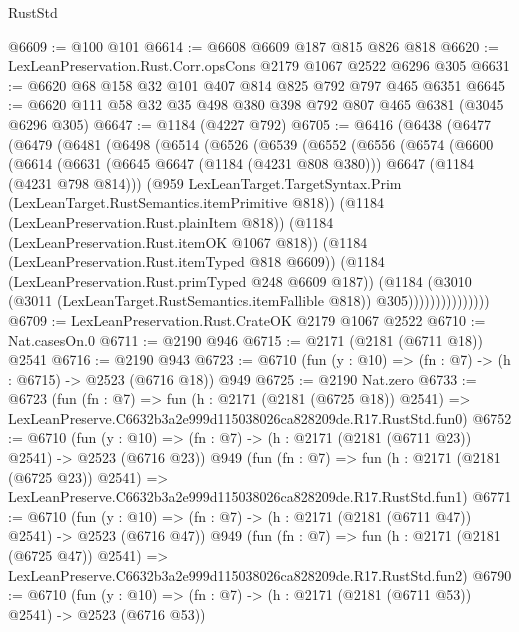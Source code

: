 \begin{lexlean}{RustStd}
\begin{coremodule}
@6609 := @100 @101
@6614 := @6608 @6609 @187 @815 @826 @818
@6620 := LexLeanPreservation.Rust.Corr.opsCons @2179 @1067 @2522 @6296 @305
@6631 := @6620 @68 @158 @32 @101 @407 @814 @825 @792 @797 @465 @6351
@6645 := @6620 @111 @58 @32 @35 @498 @380 @398 @792 @807 @465 @6381 (@3045 @6296 @305)
@6647 := @1184 (@4227 @792)
@6705 := @6416
    (@6438
      (@6477
        (@6479
          (@6481
            (@6498
              (@6514
                (@6526
                  (@6539
                    (@6552
                      (@6556
                        (@6574
                          (@6600
                            (@6614
                              (@6631
                                (@6645 @6647 (@1184 (@4231 @808 @380)))
                                @6647
                                (@1184 (@4231 @798 @814)))
                              (@959
                                LexLeanTarget.TargetSyntax.Prim
                                (LexLeanTarget.RustSemantics.itemPrimitive @818))
                              (@1184 (LexLeanPreservation.Rust.plainItem @818))
                              (@1184 (LexLeanPreservation.Rust.itemOK @1067 @818))
                              (@1184 (LexLeanPreservation.Rust.itemTyped @818 @6609))
                              (@1184 (LexLeanPreservation.Rust.primTyped @248 @6609 @187))
                              (@1184
                                (@3010
                                  (@3011 (LexLeanTarget.RustSemantics.itemFallible @818))
                                  @305)))))))))))))))
@6709 := LexLeanPreservation.Rust.CrateOK @2179 @1067 @2522
@6710 := Nat.casesOn.{0}
@6711 := @2190 @946
@6715 := @2171 (@2181 (@6711 @18)) @2541
@6716 := @2190 @943
@6723 := @6710 (fun (y : @10) => (fn : @7) -> (h : @6715) -> @2523 (@6716 @18)) @949
@6725 := @2190 Nat.zero
@6733 := @6723
    (fun (fn : @7) =>
    fun (h : @2171 (@2181 (@6725 @18)) @2541) =>
    LexLeanPreserve.C6632b3a2e999d115038026ca828209de.R17.RustStd.fun0)
@6752 := @6710
    (fun (y : @10) => (fn : @7) -> (h : @2171 (@2181 (@6711 @23)) @2541) -> @2523 (@6716 @23))
    @949
    (fun (fn : @7) =>
    fun (h : @2171 (@2181 (@6725 @23)) @2541) =>
    LexLeanPreserve.C6632b3a2e999d115038026ca828209de.R17.RustStd.fun1)
@6771 := @6710
    (fun (y : @10) => (fn : @7) -> (h : @2171 (@2181 (@6711 @47)) @2541) -> @2523 (@6716 @47))
    @949
    (fun (fn : @7) =>
    fun (h : @2171 (@2181 (@6725 @47)) @2541) =>
    LexLeanPreserve.C6632b3a2e999d115038026ca828209de.R17.RustStd.fun2)
@6790 := @6710
    (fun (y : @10) => (fn : @7) -> (h : @2171 (@2181 (@6711 @53)) @2541) -> @2523 (@6716 @53))

\end{coremodule}
\end{lexlean}
